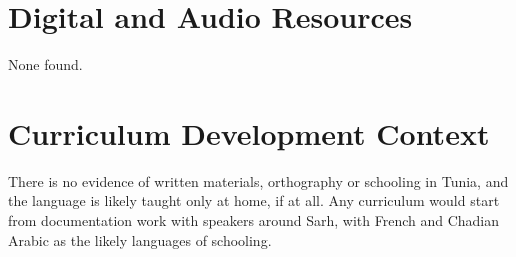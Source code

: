 \documentclass[12pt]{article}
\begin{document}
\section{Digital and Audio Resources}
None found.

\section{Curriculum Development Context}
There is no evidence of written materials, orthography or schooling in Tunia, and the language is likely taught only at home, if at all. Any curriculum would start from documentation work with speakers around Sarh, with French and Chadian Arabic as the likely languages of schooling.
\end{document}

